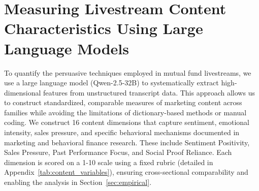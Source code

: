 \documentclass[12pt]{article}
\begin{document}
\section{Measuring Livestream Content Characteristics Using Large Language Models}\label{sec:prompts}
To quantify the persuasive techniques employed in mutual fund livestreams, we use a large language model (Qwen-2.5-32B) to systematically extract high-dimensional features from unstructured transcript data. This approach allows us to construct standardized, comparable measures of marketing content across families while avoiding the limitations of dictionary-based methods or manual coding. We construct 16 content dimensions that capture sentiment, emotional intensity, sales pressure, and specific behavioral mechanisms documented in marketing and behavioral finance research. These include Sentiment Positivity, Sales Pressure, Past Performance Focus, and Social Proof Reliance. Each dimension is scored on a 1-10 scale using a fixed rubric (detailed in Appendix~\ref{tab:content_variables}), ensuring cross-sectional comparability and enabling the analysis in Section~\ref{sec:empirical}. %
\end{document}
